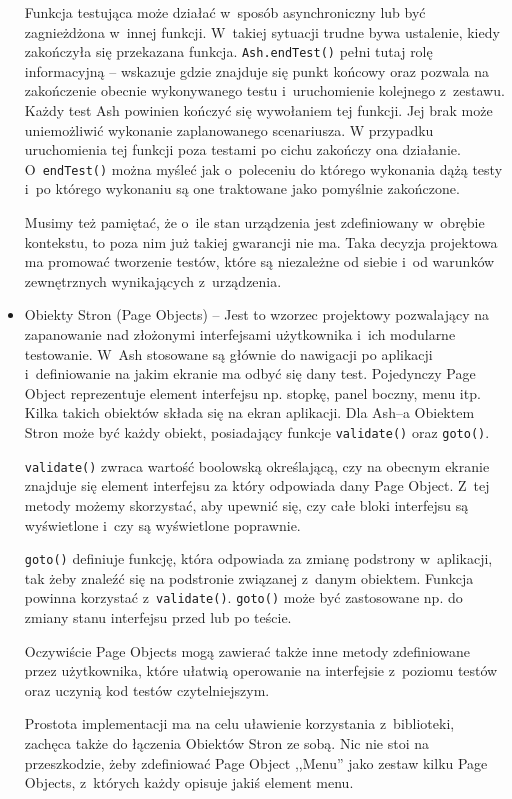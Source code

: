 \documentclass[brudnopis]{xmgr}
\begin{document}
\begin{itemize}
Funkcja testująca może działać w~sposób asynchroniczny lub być zagnieżdżona w~innej funkcji. W~takiej sytuacji trudne bywa ustalenie, kiedy zakończyła się przekazana funkcja. \texttt{Ash.endTest()} pełni tutaj rolę informacyjną -- wskazuje gdzie znajduje się punkt końcowy oraz pozwala na zakończenie obecnie wykonywanego testu i~uruchomienie kolejnego z~zestawu. Każdy test Ash powinien kończyć się wywołaniem tej funkcji. Jej brak może uniemożliwić wykonanie zaplanowanego scenariusza. W przypadku uruchomienia tej funkcji poza testami po cichu zakończy ona działanie. O~\texttt{endTest()} można myśleć jak o~poleceniu do którego wykonania dążą testy i~po którego wykonaniu są one traktowane jako pomyślnie zakończone. 

Musimy też pamiętać, że o~ile stan urządzenia jest zdefiniowany w~obrębie kontekstu, to poza nim już takiej gwarancji nie ma. Taka decyzja projektowa ma promować tworzenie testów, które są  niezależne od siebie i~od warunków zewnętrznych wynikających z~urządzenia.

  \item Obiekty Stron (Page Objects) -- Jest to wzorzec projektowy pozwalający na zapanowanie nad złożonymi interfejsami użytkownika i~ich modularne testowanie. W~Ash stosowane są głównie do nawigacji po aplikacji i~definiowanie na jakim ekranie ma odbyć się dany test. Pojedynczy Page Object reprezentuje element interfejsu np. stopkę, panel boczny, menu itp. Kilka takich obiektów składa się na ekran aplikacji. Dla Ash--a Obiektem Stron może być każdy obiekt, posiadający funkcje \texttt{validate()} oraz \texttt{goto()}.

\texttt{validate()} zwraca wartość boolowską określającą, czy na obecnym ekranie znajduje się element interfejsu za który odpowiada dany Page Object. Z~tej metody możemy skorzystać, aby upewnić się, czy całe bloki interfejsu są wyświetlone i~czy są wyświetlone poprawnie.

\texttt{goto()} definiuje funkcję, która odpowiada za zmianę podstrony w~aplikacji, tak żeby znaleźć się na podstronie związanej z~danym obiektem. Funkcja powinna korzystać z~\texttt{validate()}. \texttt{goto()} może być zastosowane np. do zmiany stanu interfejsu przed lub po teście.

Oczywiście Page Objects mogą zawierać także inne metody zdefiniowane przez użytkownika, które ułatwią operowanie na interfejsie z~poziomu testów oraz uczynią kod testów czytelniejszym.

Prostota implementacji ma na celu uławienie korzystania z~biblioteki, zachęca także do łączenia Obiektów Stron ze sobą. Nic nie stoi na przeszkodzie, żeby zdefiniować Page Object ,,Menu'' jako zestaw kilku Page Objects, z~których każdy opisuje jakiś element menu. 


\end{itemize}
\end{document}
